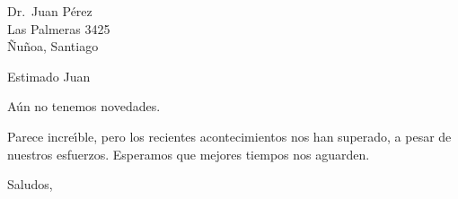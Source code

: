 \documentclass[12pt]{letter}
\begin{document}
\address{Las Palmeras 3425\\
\~Nu\~noa, Santiago}
\date{9 de Julio de 1998}

\signature{Pedro P\'erez \\ Secretario}

\begin{letter}{Dr.\ Juan P\'erez \\ Las Palmeras 3425 \\ \~Nu\~noa,
Santiago} 
\opening{Estimado Juan}

A\'un no tenemos novedades.

Parece incre\'{\i}ble, pero los recientes acontecimientos nos han
superado, a pesar de nuestros esfuerzos. Esperamos que mejores
tiempos nos aguarden.  

\closing{Saludos,}


\end{letter}
\end{document}
